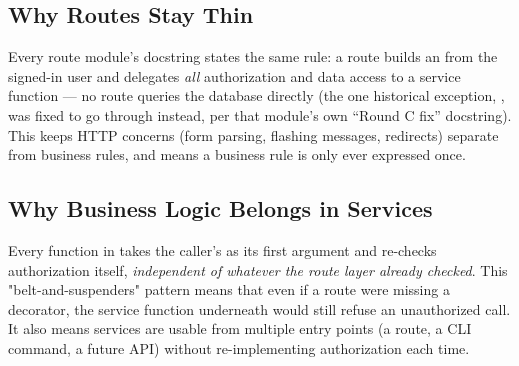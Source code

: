 \begin{center}
\end{center}

\subsection*{Why Routes Stay Thin}

Every route module's docstring states the same rule: a route builds an
 from the signed-in user and delegates \emph{all}
authorization and data access to a service function --- no route
queries the database directly (the one historical exception,
, was fixed to go through
 instead, per that module's own
``Round C fix'' docstring). This keeps HTTP concerns (form parsing,
flashing messages, redirects) separate from business rules, and means a
business rule is only ever expressed once.

\subsection*{Why Business Logic Belongs in Services}

Every function in  takes the caller's
 as its first argument and re-checks authorization
itself, \emph{independent of whatever the route layer already checked}.
This "belt-and-suspenders" pattern means that even if a route were
missing a decorator, the service function underneath would still refuse
an unauthorized call. It also means services are usable from multiple
entry points (a route, a CLI command, a future API) without
re-implementing authorization each time.

